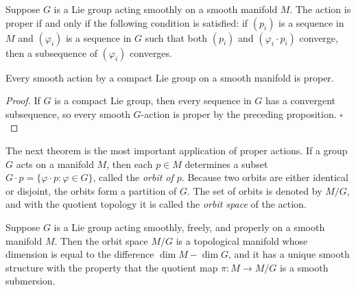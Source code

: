 \begin{proposition}[]\label{prop:proper-action-condition}
Suppose $G$ is a Lie group acting smoothly on a smooth manifold $M$. The action is proper if and only if the following condition is satisfied: if $(p_i)$ is a sequence in $M$ and $(\varphi_i)$ is a sequence in $G$ such that both $(p_i)$ and $(\varphi_i \cdot p_i)$ converge, then a subsequence of $(\varphi_i)$ converges.
\end{proposition}

\begin{corollary}[]\label{cor:compact-lie-group-actions-proper}

Every smooth action by a compact Lie group on a smooth manifold is proper.
\end{corollary}

\begin{proof}
If $G$ is a compact Lie group, then every sequence in $G$ has a convergent subsequence, so every smooth $G$-action is proper by the preceding proposition. $\square$
\end{proof}

The next theorem is the most important application of proper actions. If a group $G$ acts on a manifold $M$, then each $p \in M$ determines a subset $G \cdot p = \{\varphi \cdot p : \varphi \in G\}$, called the \textit{orbit of $p$}. Because two orbits are either identical or disjoint, the orbits form a partition of $G$. The set of orbits is denoted by $M/G$, and with the quotient topology it is called the \textit{orbit space} of the action.

\begin{theorem}\label{thm:quotient-manifold-theorem}

Suppose $G$ is a Lie group acting smoothly, freely, and properly on a smooth manifold $M$. Then the orbit space $M/G$ is a topological manifold whose dimension is equal to the difference $\dim M - \dim G$, and it has a unique smooth structure with the property that the quotient map $\pi: M \to M/G$ is a smooth submersion.
\end{theorem}

